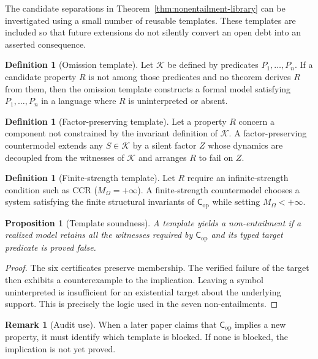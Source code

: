 \documentclass[11pt,a4paper]{article}
\newtheorem{proposition}[theorem]{Proposition}
\theoremstyle{definition}
\newtheorem{definition}[theorem]{Definition}
\newtheorem{remark}[theorem]{Remark}
\newcommand{\Cop}{\mathsf{C}_{\mathrm{op}}}
\newcommand{\MO}{M_\Omega}
\begin{document}
The candidate separations in Theorem~\ref{thm:nonentailment-library} can be investigated
using a small number of reusable templates. These templates are included so
that future extensions do not silently convert an open debt into an asserted
consequence.

\begin{definition}[Omission template]
Let $\mathcal{K}$ be defined by predicates $P_1,\dots,P_n$. If a candidate
property $R$ is not among those predicates and no theorem derives $R$ from
them, then the omission template constructs a formal model satisfying
$P_1,\dots,P_n$ in a language where $R$ is uninterpreted or absent.
\end{definition}

\begin{definition}[Factor-preserving template]
Let a property $R$ concern a component not constrained by the invariant
definition of $\mathcal{K}$. A factor-preserving countermodel extends any
$S\in\mathcal{K}$ by a silent factor $Z$ whose dynamics are decoupled from the
witnesses of $\mathcal{K}$ and arranges $R$ to fail on $Z$.
\end{definition}

\begin{definition}[Finite-strength template]
Let $R$ require an infinite-strength condition such as CCR
($\MO=+\infty$). A finite-strength countermodel chooses a system satisfying
the finite structural invariants of $\Cop$ while setting $\MO<+\infty$.
\end{definition}

\begin{proposition}[Template soundness]
A template yields a non-entailment if a realized model retains all the witnesses required by $\Cop$ and its typed target predicate is proved false.
\end{proposition}

\begin{proof}
The six certificates preserve membership. The verified failure of the target then exhibits a counterexample to the implication. Leaving a symbol uninterpreted is insufficient for an existential target about the underlying support. This is precisely the
logic used in the seven non-entailments.
\end{proof}

\begin{remark}[Audit use]
When a later paper claims that $\Cop$ implies a new property, it must identify
which template is blocked. If none is blocked, the implication is not yet
proved.
\end{remark}
\end{document}
